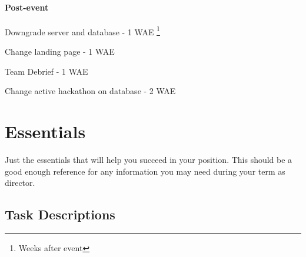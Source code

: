 \documentclass[twoside, 12pt]{article}
\begin{document}
\paragraph{Post-event}
\begin{checklist}
    \setlength\itemsep{1pt}
    \item Downgrade server and database - 1 WAE \footnote{Weeks after event}
    \item Change landing page - 1 WAE
    \item Team Debrief - 1 WAE
    \item Change active hackathon on database - 2 WAE
\end{checklist}

\newpage
\section{Essentials}
\par Just the essentials that will help you succeed in your position. This should be a good enough reference for any information you may need during your term as director.
\subsection{Task Descriptions}
\end{document}
